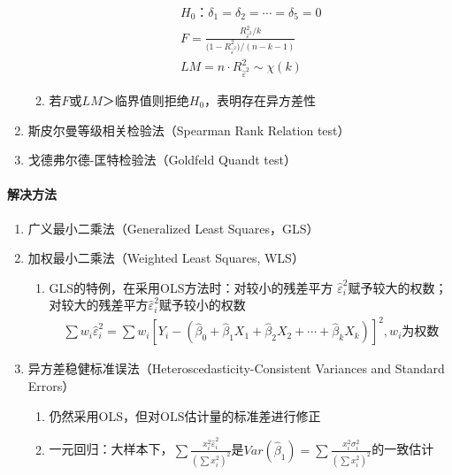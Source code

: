\documentclass[12pt]{book}
\begin{document}
\begin{enumerate}[1.]
\begin{enumerate}[(1)]
\begin{gather*}
                        H_0：δ_1=δ_2=\cdots=δ_5=0\\
                        F=\frac{R_{{\hat{\varepsilon}}^2}^2/k}{{(1-R}_{{\hat{\varepsilon}}^2}^2)/(n-k-1)}\\
                        LM=n⋅R_{{\hat{\varepsilon}}^2}^2\sim \chi(k)
                    \end{gather*}
              \item 若$F$或$LM$＞临界值则拒绝$H_0$，表明存在异方差性
          \end{enumerate}
    \item 斯皮尔曼等级相关检验法（Spearman Rank Relation test）
    \item 戈德弗尔德-匡特检验法（Goldfeld Quandt test）
\end{enumerate}



\paragraph{解决方法}

\begin{enumerate}[1.]
    \item 广义最小二乘法（Generalized Least Squares，GLS）
    \item 加权最小二乘法（Weighted Least Squares, WLS）
          \begin{enumerate}[(1)]
              \item GLS的特例，在采用OLS方法时：对较小的残差平方 $\hat{\varepsilon}_i^2$赋予较大的权数；对较大的残差平方$\hat{\varepsilon}_i^2$赋予较小的权数
                    \begin{gather*}
                        \sum{w_i \hat{\varepsilon}_i^2}=\sum{w_i\left[Y_i-(\hat{\beta}_0+\hat{\beta}_1 X_1 + \hat{\beta}_2 X_2 +\cdots+\hat{\beta}_k X_k)\right]^2}, w_i\text{为权数}
                    \end{gather*}
          \end{enumerate}
    \item 异方差稳健标准误法（Heteroscedasticity-Consistent Variances and Standard Errors）
          \begin{enumerate}[(1)]
              \item 仍然采用OLS，但对OLS估计量的标准差进行修正
              \item 一元回归：大样本下，$\sum{ \frac{x_i^2 \hat{\varepsilon}_i^2}{(\sum{x_i^2})^2}}$是$Var(\hat{\beta}_1) = \sum{ \frac{x_i^2 \sigma_i^2}{(\sum{x_i^2})^2}}$的一致估计
          \end{enumerate}
\end{enumerate}
\end{document}
